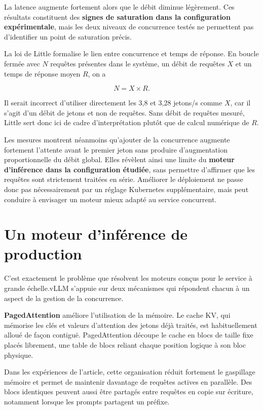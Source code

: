 \documentclass[10pt,a4paper]{article}
\begin{document}
La latence augmente fortement alors que le débit diminue légèrement. Ces
résultats constituent des \textbf{signes de saturation dans la configuration
expérimentale}, mais les deux niveaux de concurrence testés ne permettent pas
d'identifier un point de saturation précis.

La loi de Little formalise le lien entre concurrence et temps de réponse.
En boucle fermée avec $N$ requêtes présentes dans le système, un débit de
requêtes $X$ et un temps de réponse moyen $R$, on a

\[
N=X\times R.
\]

Il serait incorrect d'utiliser directement les 3,8 et 3,28 jetons/s comme
$X$, car il s'agit d'un débit de jetons et non de requêtes. Sans débit de
requêtes mesuré, Little sert donc ici de cadre d'interprétation plutôt que
de calcul numérique de $R$.

Les mesures montrent néanmoins qu'ajouter de la concurrence augmente fortement
l'attente avant le premier jeton sans produire d'augmentation proportionnelle
du débit global. Elles révèlent ainsi une limite du \textbf{moteur d'inférence
dans la configuration étudiée}, sans permettre d'affirmer que les requêtes
sont strictement traitées en série. Améliorer le déploiement ne passe donc pas
nécessairement par un réglage Kubernetes supplémentaire, mais peut conduire
à envisager un moteur mieux adapté au service concurrent.

\section{Un moteur d'inférence de production}

C'est exactement le problème que résolvent les moteurs conçus pour le service
à grande échelle.vLLM s'appuie sur deux mécanismes qui répondent chacun à
un aspect de la gestion de la concurrence.

\textbf{PagedAttention} améliore l'utilisation de la mémoire. Le cache KV,
qui mémorise les clés et valeurs d'attention des jetons déjà traités, est
habituellement alloué de façon contiguë. PagedAttention découpe le cache en
blocs de taille fixe placés librement, une table de blocs reliant chaque
position logique à son bloc physique.

Dans les expériences de l'article, cette organisation réduit fortement le
gaspillage mémoire et permet de maintenir davantage de requêtes actives en
parallèle. Des blocs identiques peuvent aussi être partagés entre requêtes
en copie sur écriture, notamment lorsque les prompts partagent un préfixe.
\end{document}

